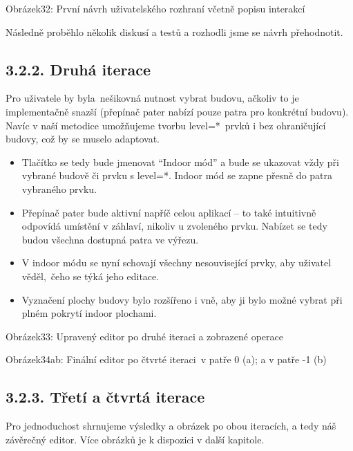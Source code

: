 Obrázek32: První návrh uživatelského rozhraní včetně popisu interakcí

Následně proběhlo několik diskusí a testů a rozhodli jsme se návrh přehodnotit.

\subsection{3.2.2. Druhá iterace}\label{druhuxe1-iterace}

Pro uživatele by byla~nešikovná nutnost vybrat budovu, ačkoliv to je implementačně snazší (přepínač pater nabízí pouze patra pro konkrétní budovu). Navíc v naší metodice umožňujeme tvorbu level=*~prvků i bez ohraničující budovy, což by se muselo adaptovat.

\begin{itemize}
\tightlist
\item
  Tlačítko se tedy bude jmenovat ``Indoor mód'' a bude se ukazovat vždy při vybrané budově či prvku s level=*. Indoor mód se zapne přesně do patra vybraného prvku.
\item
  Přepínač pater bude aktivní napříč celou aplikací -- to také intuitivně odpovídá umístění v záhlaví, nikoliv u zvoleného prvku. Nabízet se tedy budou všechna dostupná patra ve výřezu.
\item
  V indoor módu se nyní schovají všechny nesouvisející prvky, aby uživatel věděl,~čeho se týká jeho editace.
\item
  Vyznačení plochy budovy bylo rozšířeno i vně, aby ji bylo možné vybrat při plném pokrytí indoor plochami.
\end{itemize}

Obrázek33: Upravený editor po druhé iteraci a zobrazené operace

Obrázek34ab: Finální editor po čtvrté iteraci~v patře 0 (a); a v patře -1 (b)

\subsection{3.2.3. Třetí a čtvrtá iterace}\label{tux159etuxed-a-ux10dtvrtuxe1-iterace}

Pro jednoduchost shrnujeme výsledky a obrázek po obou iteracích, a tedy náš závěrečný editor. Více obrázků je k dispozici v další kapitole.

